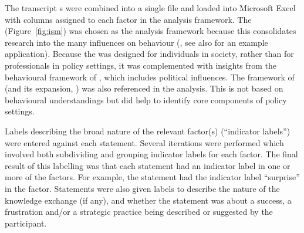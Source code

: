 The transcript \CSV s were combined into a single \CSV{} file and loaded into Microsoft Excel with columns assigned to each factor in the analysis framework. The \ISM{} (Figure~\ref{fig:ism}) was chosen as the analysis framework because this consolidates research into the many influences on behaviour (\cite{DarntonH2013}, see also \cite{MinamitaniDOI2024} for an example application). Because the \ISM{} was designed for individuals in society, rather than for professionals in policy settings, it was complemented with insights from the behavioural framework of \textcite{HamptonW2023}, which includes political influences. The framework of \textcite{BuseMW2012} (and its expansion, \cite{HaynesDCRHGS2011}) was also referenced in the analysis. This is not based on behavioural understandings but did help to identify core components of policy settings.

Labels describing the broad nature of the relevant factor(s) (``indicator labels'') were entered against each statement. Several iterations were performed which involved both subdividing and grouping indicator labels for each factor. The final result of this labelling was that each statement had an indicator label in one or more of the \ISM{} factors. For example, the statement  had the indicator label ``surprise'' in the \ismie{} factor. Statements were also given labels to describe the nature of the knowledge exchange (if any), and whether the statement was about a success, a frustration and/or a strategic practice being described or suggested by the participant.




